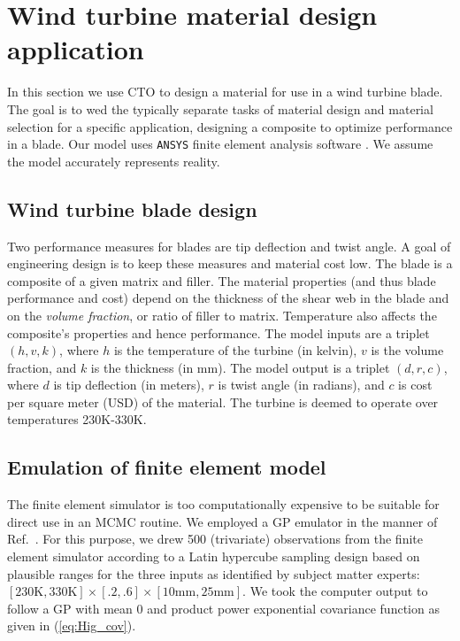 \documentclass[twocolumn,10pt]{asme2ej}
\begin{document}
\section{Wind turbine material design application}\label{application}

In this section we use CTO to design a material for use in a wind turbine blade. %
%
The goal is to wed the typically separate tasks of material design and material selection for a specific application, designing a composite to optimize performance in a blade.
%
Our model uses \texttt{ANSYS} finite element analysis software \cite{ansys}. 
We assume the model accurately represents reality.

\subsection{Wind turbine blade design}

Two performance measures for blades are tip deflection and twist angle.
%
A goal of engineering design is to keep these measures and material cost low.
%
The blade is a composite of a given matrix and filler. 
%
%
The material properties (and thus blade performance and cost) depend on the thickness of the shear web in the blade and on the \emph{volume fraction}, or ratio of filler to matrix.
%
%
Temperature also affects the composite's properties and hence performance.
%
The model inputs are a triplet $(h,v,k)$, where $h$ is the temperature of the turbine (in kelvin), $v$ is the volume fraction, and $k$ is the thickness (in mm). 
%
The model output is a triplet $(d,r,c)$, where $d$ is tip deflection (in meters), $r$ is twist angle (in radians), and $c$ is cost per square meter (USD) of the material.
%
The turbine is deemed to operate over temperatures 230K-330K. 
%

\subsection{Emulation of finite element model}\label{emulator} %
The finite element simulator is too computationally expensive to be suitable for direct use in an MCMC routine. 
%
We employed a GP emulator in the manner of Ref.\ \cite{Williams2006}. 
%
For this purpose, we drew 500 (trivariate) observations from the finite element simulator according to a Latin hypercube sampling design \cite{McKay1979} based on plausible ranges for the three inputs as identified by subject matter experts: $[230\mathrm{K}, 330\mathrm{K}] \times [.2,.6]\times[10\mathrm{mm},25\mathrm{mm}]$.
%
We took the computer output to follow a GP with mean 0 and product power exponential covariance function as given in (\ref{eq:Hig_cov}).
%
\end{document}
